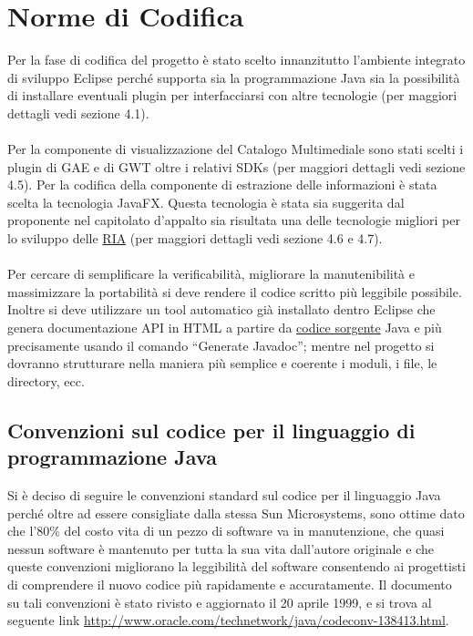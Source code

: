 \chapter{Norme di Codifica}
\thispagestyle{fancy} 
Per la fase di codifica del progetto \`e stato scelto innanzitutto l'ambiente
integrato di sviluppo Eclipse perch\'e supporta sia la programmazione Java
sia la possibilit\`a  di installare eventuali plugin per interfacciarsi con
altre tecnologie (per maggiori dettagli vedi sezione 4.1).\\ \\
Per la componente di visualizzazione del Catalogo
Multimediale sono stati scelti i plugin di GAE e di GWT oltre i relativi SDKs
(per maggiori dettagli vedi sezione 4.5). 
Per la codifica della componente di estrazione delle informazioni \`e stata
scelta la tecnologia JavaFX. Questa tecnologia \`e stata sia suggerita dal
proponente nel capitolato d'appalto sia risultata una delle tecnologie migliori
per lo sviluppo delle \underline{RIA} (per maggiori dettagli vedi sezione 4.6 e
4.7). \\ \\
Per cercare di semplificare la verificabilit\`a, migliorare la
manutenibilit\`a e massimizzare la portabilit\`a si deve rendere il codice
scritto pi\`u leggibile possibile.
Inoltre si deve utilizzare un tool automatico gi\`a
installato dentro Eclipse che genera documentazione API in HTML a partire da
\underline{codice sorgente} Java e pi\`u precisamente usando il comando
``Generate Javadoc''; mentre nel progetto si dovranno strutturare nella maniera pi\`u semplice e coerente i moduli, i
file, le directory, ecc.\\
 
\section{Convenzioni sul codice per il linguaggio di \\programmazione Java}
Si \`e deciso di seguire le convenzioni standard sul codice per il linguaggio
Java perch\'e oltre ad essere consigliate dalla stessa Sun Microsystems, sono
ottime dato che l'80\% del costo vita di un pezzo di software va in
manutenzione, che quasi nessun software \`e mantenuto per tutta la sua vita
dall'autore originale e che queste convenzioni migliorano la leggibilit\`a
del software consentendo ai progettisti di comprendere il nuovo codice pi\`u
rapidamente e accuratamente.
Il documento su tali convenzioni \`e stato rivisto e aggiornato il 20 aprile
1999, e si trova al seguente link
\url{http://www.oracle.com/technetwork/java/codeconv-138413.html}.

